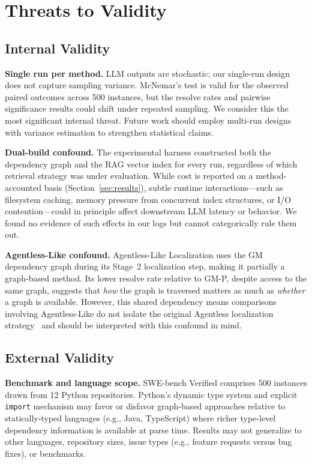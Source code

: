 \section{Threats to Validity}
\label{sec:threats}

\subsection{Internal Validity}

\textbf{Single run per method.}
LLM outputs are stochastic; our single-run design does not capture sampling variance.
McNemar's test is valid for the observed paired outcomes across 500 instances, but the resolve rates and pairwise significance results could shift under repeated sampling.
We consider this the most significant internal threat.
Future work should employ multi-run designs with variance estimation to strengthen statistical claims.

\textbf{Dual-build confound.}
The experimental harness constructed both the dependency graph and the RAG vector index for every run, regardless of which retrieval strategy was under evaluation.
While cost is reported on a method-accounted basis (Section~\ref{sec:results}), subtle runtime interactions---such as filesystem caching, memory pressure from concurrent index structures, or I/O contention---could in principle affect downstream LLM latency or behavior.
We found no evidence of such effects in our logs but cannot categorically rule them out.

\textbf{Agentless-Like confound.}
Agentless-Like Localization uses the GM dependency graph during its Stage~2 localization step, making it partially a graph-based method.
Its lower resolve rate relative to GM-P, despite access to the same graph, suggests that \emph{how} the graph is traversed matters as much as \emph{whether} a graph is available.
However, this shared dependency means comparisons involving Agentless-Like do not isolate the original Agentless localization strategy~\cite{xia2024agentless} and should be interpreted with this confound in mind.

\subsection{External Validity}

\textbf{Benchmark and language scope.}
SWE-bench Verified comprises 500 instances drawn from 12 Python repositories.
Python's dynamic type system and explicit \texttt{import} mechanism may favor or disfavor graph-based approaches relative to statically-typed languages (e.g., Java, TypeScript) where richer type-level dependency information is available at parse time.
Results may not generalize to other languages, repository sizes, issue types (e.g., feature requests versus bug fixes), or benchmarks.

